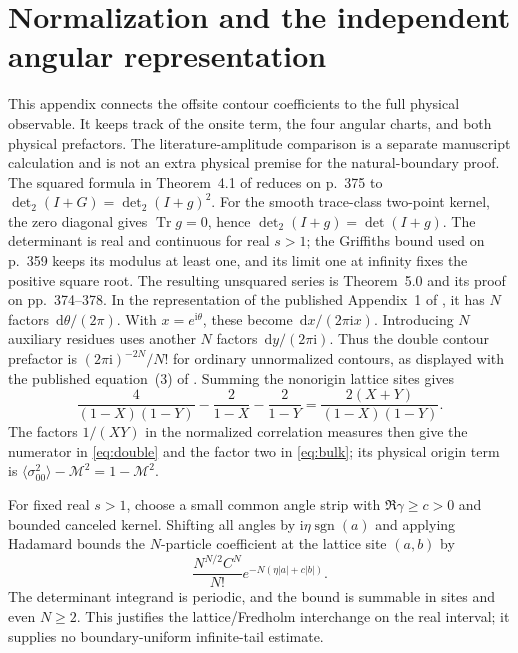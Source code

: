 \documentclass[11pt]{article}
\numberwithin{equation}{section}
\theoremstyle{definition}
\newcommand{\dd}{\,\mathrm d}
\newcommand{\ii}{\mathrm i}
\newcommand{\M}{\mathcal M}
\begin{document}


\section{Normalization and the independent angular representation}
\label{app:normalization}

This appendix connects the offsite contour coefficients to the full
physical observable. It keeps track of the onsite term, the four
angular charts, and both physical prefactors. The literature-amplitude
comparison is a separate manuscript calculation and is not an extra
physical premise for the natural-boundary proof.
The squared formula in Theorem~4.1 of \cite{PalmerTracy1981}
reduces on p.~375 to \(\det_2(I+G)=\det_2(I+g)^2\).
For the smooth trace-class two-point kernel, the zero diagonal gives
\(\operatorname{Tr}g=0\), hence \(\det_2(I+g)=\det(I+g)\).
The determinant is real and continuous for real \(s>1\);
the Griffiths bound used on p.~359 keeps its modulus at least one,
and its limit one at infinity fixes the positive square root.
The resulting unsquared series is Theorem~5.0 and its proof on
pp.~374--378. In the representation of the published Appendix~1
of \cite{TW2014}, it has
\(N\) factors \(\dd\theta/(2\pi)\).
With \(x=e^{\ii\theta}\), these become \(\dd x/(2\pi\ii x)\).
Introducing \(N\) auxiliary residues uses another \(N\) factors
\(\dd y/(2\pi\ii)\). Thus the double contour prefactor is
\((2\pi\ii)^{-2N}/N!\) for ordinary unnormalized contours,
as displayed with the published equation~(3) of \cite{TW2014}.
Summing the nonorigin lattice sites gives
\[
 \frac4{(1-X)(1-Y)}-\frac2{1-X}-\frac2{1-Y}
 =\frac{2(X+Y)}{(1-X)(1-Y)}.
\]
The factors \(1/(XY)\) in the normalized correlation measures
then give the numerator in \eqref{eq:double} and the factor two
in \eqref{eq:bulk}; its physical origin term is
\(\langle\sigma_{00}^2\rangle-\M^2=1-\M^2\).

For fixed real \(s>1\), choose a small common angle strip with
\(\Re\gamma\ge c>0\) and bounded canceled kernel. Shifting all angles
by \(\ii\eta\operatorname{sgn}(a)\) and applying Hadamard bounds the
\(N\)-particle coefficient at the lattice site \((a,b)\) by
\[
 \frac{N^{N/2}C^N}{N!}
 e^{-N(\eta|a|+c|b|)}.
\]
The determinant integrand is periodic, and the bound is summable in
sites and even \(N\ge2\). This justifies the lattice/Fredholm
interchange on the real interval; it supplies no boundary-uniform
infinite-tail estimate.
\end{document}
